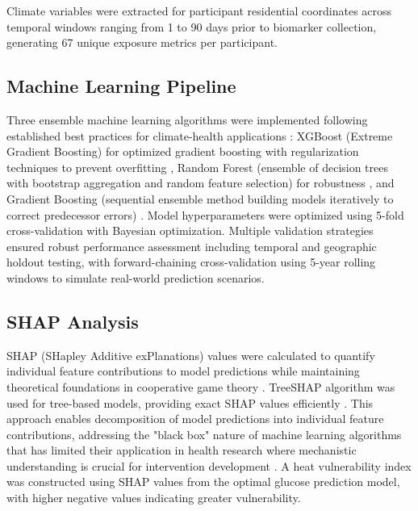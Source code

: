 \documentclass[11pt,a4paper]{article}
\begin{document}
Climate variables were extracted for participant residential coordinates across temporal windows ranging from 1 to 90 days prior to biomarker collection, generating 67 unique exposure metrics per participant.

\subsection{Machine Learning Pipeline}

Three ensemble machine learning algorithms were implemented following established best practices for climate-health applications \cite{basu2018machine,hirano2021machine}: XGBoost (Extreme Gradient Boosting) for optimized gradient boosting with regularization techniques to prevent overfitting \cite{chen2016xgboost}, Random Forest (ensemble of decision trees with bootstrap aggregation and random feature selection) for robustness \cite{breiman2001random}, and Gradient Boosting (sequential ensemble method building models iteratively to correct predecessor errors) \cite{friedman2001greedy}. Model hyperparameters were optimized using 5-fold cross-validation with Bayesian optimization. Multiple validation strategies ensured robust performance assessment including temporal and geographic holdout testing, with forward-chaining cross-validation using 5-year rolling windows to simulate real-world prediction scenarios.

\subsection{SHAP Analysis}

SHAP (SHapley Additive exPlanations) values were calculated to quantify individual feature contributions to model predictions while maintaining theoretical foundations in cooperative game theory \cite{lundberg2017unified}. TreeSHAP algorithm was used for tree-based models, providing exact SHAP values efficiently \cite{lundberg2020local}. This approach enables decomposition of model predictions into individual feature contributions, addressing the "black box" nature of machine learning algorithms that has limited their application in health research where mechanistic understanding is crucial for intervention development \cite{murdoch2019definitions}. A heat vulnerability index was constructed using SHAP values from the optimal glucose prediction model, with higher negative values indicating greater vulnerability.
\end{document}
